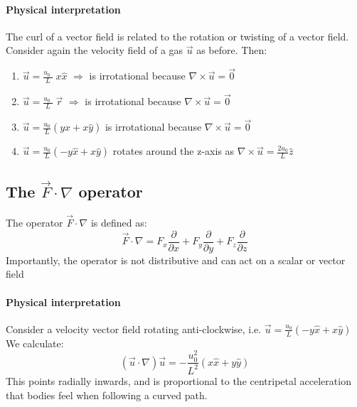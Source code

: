 \documentclass[11pt]{article}
\begin{document}
        \paragraph{Physical interpretation} The curl of a vector field is related to the rotation or twisting of a vector field.
        Consider again the velocity field of a gas $\vec{u}$ as before.
        Then:
        \begin{enumerate}
            \item $\vec{u} = \frac{u_0\;}{L} \; x \hat{x}$ $\Rightarrow$ is irrotational because $ \nabla \times \vec{u} = \vec{0}$
            \item $\vec{u} = \frac{u_0\;}{L} \; \vec{r}$ $\Rightarrow$ is irrotational because $ \nabla \times \vec{u} = \vec{0}$
            \item $\vec{u} = \frac{u_0}{L}({y\hat{x} + x \hat{y}})$ is irrotational because $ \nabla \times \vec{u} = \vec{0}$
            \item $\vec{u} = \frac{u_0}{L}({-y\hat{x} + x \hat{y}})$ rotates around the z-axis as $\nabla \times \vec{u} = \frac{2u_0}{L}\hat{z}$
       \end{enumerate}
        \subsection{The $\vec{F} \cdot \nabla$ operator}\label{subsec:the-$vec{f}-cdot-nabla$-operator}
            The operator $\vec{F} \cdot \nabla$ is defined as:
            \begin{equation}
                \label{eq:equation4}
                \vec{F} \cdot \nabla = F_x \frac{\partial}{\partial x} + F_y \frac{\partial}{\partial y} + F_z \frac{\partial}{\partial z}
            \end{equation}
            Importantly, the operator is not distributive and can act on a scalar or vector field
            \paragraph{Physical interpretation} Consider a velocity vector field rotating anti-clockwise, i.e. $\vec{u} = \frac{u_0}{L}(-y\hat{x} + x\hat{y})$\\
            We calculate:
            \begin{equation}
                \label{eq:equation5}
                (\vec{u} \cdot \nabla) \vec{u} = -\frac{u^2_0}{L^2}(x\hat{x} + y\hat{y})
            \end{equation}
            This points radially inwards, and is proportional to the centripetal acceleration that bodies feel when following
            a curved path.
\end{document}
